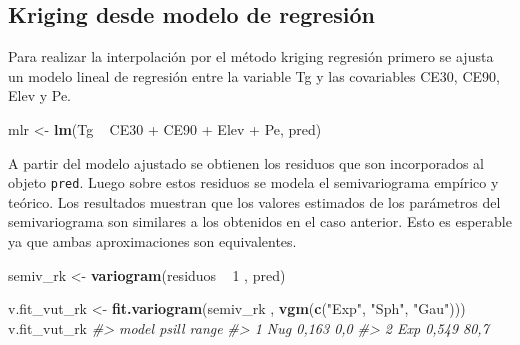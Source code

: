 \documentclass[11pt,b5paper,]{krantz}
\newenvironment{Shaded}{}{}
\newcommand{\CommentTok}[1]{\textcolor[rgb]{0.38,0.63,0.69}{\textit{#1}}}
\newcommand{\DecValTok}[1]{\textcolor[rgb]{0.25,0.63,0.44}{#1}}
\newcommand{\KeywordTok}[1]{\textcolor[rgb]{0.00,0.44,0.13}{\textbf{#1}}}
\newcommand{\NormalTok}[1]{#1}
\newcommand{\OperatorTok}[1]{\textcolor[rgb]{0.40,0.40,0.40}{#1}}
\newcommand{\StringTok}[1]{\textcolor[rgb]{0.25,0.44,0.63}{#1}}
\begin{document}
\hypertarget{kriging-desde-modelo-de-regresiuxf3n}{%
\subsection{Kriging desde modelo de regresión}\label{kriging-desde-modelo-de-regresiuxf3n}}

Para realizar la interpolación por el método kriging regresión primero se ajusta un modelo lineal de regresión entre la variable Tg y las covariables CE30, CE90, Elev y Pe.

\begin{Shaded}
\begin{Highlighting}[]
\NormalTok{mlr <-}\StringTok{ }\KeywordTok{lm}\NormalTok{(Tg }\OperatorTok{~}\StringTok{ }\NormalTok{CE30 }\OperatorTok{+}\StringTok{ }\NormalTok{CE90 }\OperatorTok{+}\StringTok{ }\NormalTok{Elev }\OperatorTok{+}\StringTok{ }\NormalTok{Pe, pred)}
\end{Highlighting}
\end{Shaded}

A partir del modelo ajustado se obtienen los residuos que son incorporados al objeto \texttt{pred}. Luego sobre estos residuos se modela el semivariograma empírico y teórico. Los resultados muestran que los valores estimados de los parámetros del semivariograma son similares a los obtenidos en el caso anterior. Esto es esperable ya que ambas aproximaciones son equivalentes.

\begin{Shaded}
\end{Shaded}

\begin{Shaded}
\begin{Highlighting}[]
\NormalTok{semiv_rk <-}\StringTok{ }\KeywordTok{variogram}\NormalTok{(residuos }\OperatorTok{~}\StringTok{ }\DecValTok{1}\NormalTok{ , pred)}

\NormalTok{v.fit_vut_rk <-}\StringTok{ }
\StringTok{  }\KeywordTok{fit.variogram}\NormalTok{(semiv_rk , }
                \KeywordTok{vgm}\NormalTok{(}\KeywordTok{c}\NormalTok{(}\StringTok{"Exp"}\NormalTok{, }\StringTok{"Sph"}\NormalTok{, }\StringTok{"Gau"}\NormalTok{)))}
\NormalTok{v.fit_vut_rk}
\CommentTok{#>   model psill range}
\CommentTok{#> 1   Nug 0,163   0,0}
\CommentTok{#> 2   Exp 0,549  80,7}
\end{Highlighting}
\end{Shaded}
\end{document}

